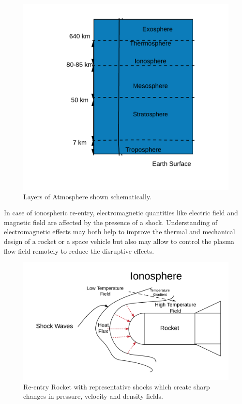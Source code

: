 \documentclass[12pt]{report}
\begin{document}
\begin{figure}
\label{fig:Atmosphere}
  \centering
      \includegraphics[scale=0.3]{AtmosphereLayers.png}
      \caption{Layers of Atmosphere shown schematically.}
\end{figure}
In case of ionospheric re-entry, electromagnetic quantities like electric field and magnetic field\cite{Savino,Votta} are affected by the presence of a shock. Understanding of electromagnetic effects may both help to improve the thermal and mechanical design of a rocket or a space vehicle but also may allow to control the plasma flow field remotely to reduce the disruptive effects.

\begin{figure}
\label{fig:rocket}
  \centering
      \includegraphics[scale=0.2]{Rocket.png}
  \caption{Re-entry Rocket with representative shocks which create sharp changes in pressure, velocity and density fields.}
\end{figure}
\end{document}
